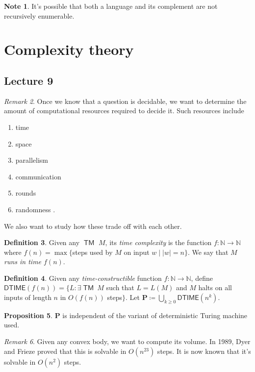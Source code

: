 \documentclass[10pt,letterpaper,cm]{nupset}
\theoremstyle{definition}
\newtheorem{definition}{Definition}[subsection]
\newtheorem{note}[definition]{Note}
\theoremstyle{theorem}
\newtheorem{prop}[definition]{Proposition}
\theoremstyle{remark}
\newtheorem{remark}[definition]{Remark}
\newcommand{\N}{\mathbb N}
\newcommand{\1}{\mathbf{1}}
\newcommand{\0}{\vec 0}
\DeclareMathOperator{\TM}{\mathsf{TM}}
\begin{document}
\begin{note}
It's possible that both a language and its complement are not recursively enumerable. 
\end{note}

\newpage

\section{Complexity theory}

\subsection{Lecture 9}

\begin{remark}
Once we know that a question is decidable, we want to determine the amount of computational resources required to decide it. Such resources include 
\begin{enumerate}[label=(\alph*)]
\item time
\item space
\item parallelism 
\item communication 
\item rounds
\item randomness
.\end{enumerate}
We also want to study how these trade off with each other. 
\end{remark}

\begin{definition}
Given any $\TM$ $M$, its \textit{time complexity} is the function $f: \N \to \N$ where $f(n) =\max\{$steps used by $M$ on input $w\mid |w| =n\}$. We say that $M$ \textit{runs in time $f(n)$}.
\end{definition}

\begin{definition}
 Given any \textit{time-constructible} function $f: \N \to \N$, define $\mathsf{DTIME}(f(n)) = \{ L : \exists \TM \ M$ such that $L = L(M)$ and $M$ halts on all inputs of length $n$ in $O(f(n))$ steps$\}$.
Let $\mathbf{P} \coloneqq \bigcup_{k\geq 0} \mathsf{DTIME}(n^k)$.
\end{definition}

\begin{prop}
$\mathbf{P}$ is independent of the variant of deterministic Turing machine used. 
\end{prop}

\begin{remark}
Given any convex body, we want to compute its volume. In 1989, Dyer and Frieze proved that this is solvable in $O(n^{23})$ steps. It is now known that it's solvable in $O(n^2)$ steps. 
\end{remark}
\end{document}
